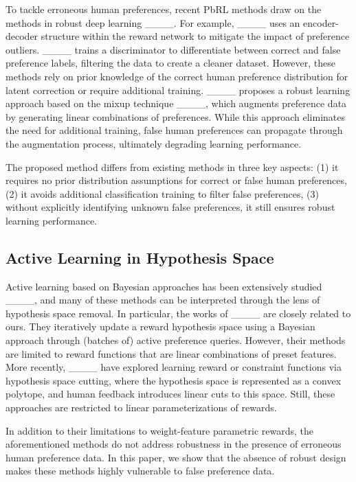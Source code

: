 To tackle erroneous human preferences, recent PbRL methods draw on the methods in robust deep learning ____. For example, ____ uses an encoder-decoder structure within the reward network to mitigate the impact of preference outliers. ____ trains a discriminator to differentiate between correct and false preference labels, filtering the data to create a cleaner dataset. However, these methods rely on prior knowledge of the correct human preference distribution for latent correction or require additional training.  ____ proposes a robust learning approach based on the mixup technique ____, which augments preference data by generating linear combinations of preferences. While this approach eliminates the need for additional training, false human preferences can propagate through the augmentation process, ultimately degrading learning performance. 

The proposed method differs from existing methods in three key aspects: (1) it requires no prior distribution assumptions for correct or false human preferences, (2) it avoids additional classification training to filter false preferences, (3) without explicitly identifying unknown false preferences, it still ensures robust learning performance.

\vspace{-5pt}
\subsection{Active Learning in Hypothesis Space}
\vspace{-5pt}
Active learning based on Bayesian approaches has been extensively studied ____, and many of these methods can be interpreted through the lens of hypothesis space removal. In particular, the works of ____ are closely related to ours. They iteratively update a reward hypothesis space using a Bayesian approach through (batches of) active preference queries. However, their methods are limited to reward functions that are linear combinations of preset features. More recently, ____ have explored learning reward or constraint functions via hypothesis space cutting, where the hypothesis space is represented as a convex polytope, and human feedback introduces linear cuts to this space. Still, these approaches are restricted to linear parameterizations of rewards.

In addition to their limitations to weight-feature parametric rewards, the aforementioned methods do not address robustness in the presence of erroneous human preference data. In this paper, we show that the absence of robust design makes these methods highly vulnerable to false preference data.